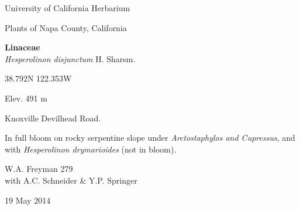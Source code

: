 \documentclass[letterpaper,10pt]{article}
\begin{document}
\begin{minipage}[t]{0.40\textwidth}

\begin{center}
University of California Herbarium \\
\begin{large}
Plants of Napa County, California \\
\end{large}
\vspace{\baselineskip}
\textbf{Linaceae} \\
\textit{Hesperolinon disjunctum} H. Sharsm.\\
\end{center}

\begin{footnotesize}

\begin{multicols}{2}
38.792\textdegree N 122.353\textdegree W
\columnbreak
\begin{flushright}
Elev. 491 m
\end{flushright}
\end{multicols}

Knoxville Devilhead Road.
\vspace{\baselineskip}

In full bloom on rocky serpentine slope under \textit{Arctostaphylos and Cupressus}, and with \textit{Hesperolinon drymarioides} (not in bloom).

\begin{multicols}{2}
W.A. Freyman 279 \\
with A.C. Schneider \& Y.P. Springer
\columnbreak
\begin{flushright}
19 May 2014
\end{flushright}
\end{multicols}

\end{footnotesize}

\end{minipage}

\vspace{2cm}
%
%

%
%
\end{document}
